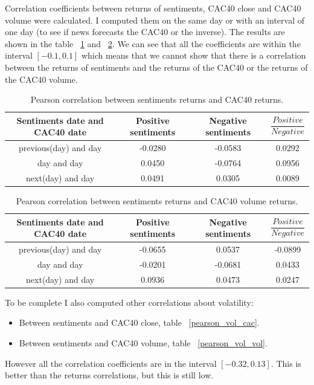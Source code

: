 \documentclass[12pt]{report}
\begin{document}
			Correlation coefficients between returns of sentiments, CAC40 close and CAC40 volume were calculated. I computed them on the same day or with an interval of one day (to see if news forecasts the CAC40 or the inverse). The results are shown in the table ~\ref{pearson_cac} and ~\ref{pearson_volume}. We can see that all the coefficients are within the interval $[-0.1, 0.1]$ which means that we cannot show that there is a correlation between the returns of sentiments and the returns of the CAC40 or the returns of the CAC40 volume.

			\begin{table}
			\begin{tabular}{|c || c | c | c|}
				\hline
				Sentiments date and CAC40 date & Positive sentiments & Negative sentiments & $\dfrac{Positive}{Negative}$\\
				\hline
				previous(day) and day & -0.0280 & -0.0583 & 0.0292\\
				\hline
				day and day & 0.0450 & -0.0764 & 0.0956\\
				\hline
				next(day) and day & 0.0491 & 0.0305 & 0.0089\\
				\hline
			\end{tabular}

			\caption{Pearson correlation between sentiments returns and CAC40 returns.\label{pearson_cac}}
			\end{table}

			\begin{table}
			\begin{tabular}{|c || c | c | c|}
				\hline
				Sentiments date and CAC40 date & Positive sentiments & Negative sentiments & $\dfrac{Positive}{Negative}$\\
				\hline
				previous(day) and day & -0.0655 & 0.0537 & -0.0899\\
				\hline
				day and day & -0.0201 & -0.0681 & 0.0433\\
				\hline
				next(day) and day & 0.0936 & 0.0473 & 0.0247\\
				\hline
			\end{tabular}

			\caption{Pearson correlation between sentiments returns and CAC40 volume returns.\label{pearson_volume}}
			\end{table}

		To be complete I also computed other correlations about volatility:
			\begin{itemize}
				\item Between sentiments and CAC40 close, table ~\ref{pearson_vol_cac}.
				\item Between sentiments and CAC40 volume, table ~\ref{pearson_vol_vol}.
			\end{itemize}
			However all the correlation coefficients are in the interval $[-0.32, 0.13]$. This is better than the returns correlations, but this is still low.
\end{document}
